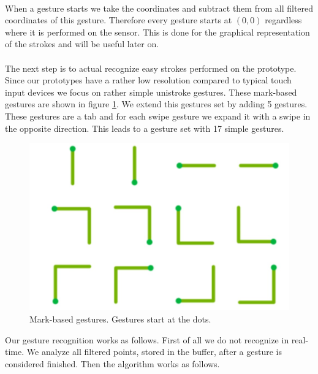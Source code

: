 \\
When a gesture starts we take the coordinates and subtract them from all filtered coordinates of this gesture. Therefore every gesture starts at $(0,0)$ regardless where it is performed on the sensor. This is done for the graphical representation of the strokes and will be useful later on.
\\ \\
The next step is to actual recognize easy strokes performed on the prototype.  Since our prototypes have a rather low resolution compared to typical touch input devices we focus on rather simple unistroke gestures. These mark-based gestures are shown in figure \ref{fig:markBasedGestures}. We extend this gestures set by adding 5 gestures. These gestures are a tab and for each swipe gesture we expand it with a swipe in the opposite direction. This leads to a gesture set with 17 simple gestures. \\
\begin{figure}
 \includegraphics[scale=0.25]{images/markBasedGestures.jpg}
 \caption{Mark-based gestures. Gestures start at the dots. \cite{Bragdon}}
 \label{fig:markBasedGestures}
 \end{figure}Our gesture recognition works as follows. First of all we do not recognize in real-time. We analyze all filtered points, stored in the buffer, after a gesture is considered finished.  Then the algorithm works as follows.
